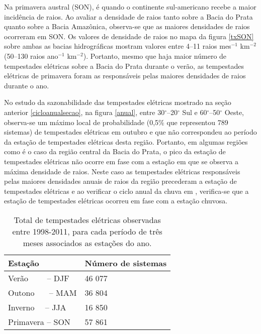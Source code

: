 Na primavera austral (SON), é quando o continente sul-americano recebe a maior incidência de raios. Ao avaliar a densidade de raios tanto sobre a Bacia do Prata quanto sobre a Bacia Amazônica, observa-se que as maiores densidades de raios ocorreram em SON. Os valores de densidade de raios no mapa da figura \ref{txSON} sobre ambas as bacias hidrográficas  mostram valores entre 4--11 raios mes$^{-1}$ km$^{-2}$ (50--130 raios ano$^{-1}$ km$^{-2}$). Portanto, mesmo que haja maior número de tempestades elétricas sobre a Bacia do Prata durante o verão, as tempestades elétricas de primavera foram as responsáveis pelas maiores densidades de raios durante o ano.

No estudo da sazonabilidade das tempestades elétricas mostrado na seção anterior \ref{cicloanualsecao}, na figura \ref{anual}, entre 30$^{\circ}$--20$^{\circ}$ Sul e 60$^{\circ}$--50$^{\circ}$ Oeste, observa-se um máximo local de probabilidade (0,5\% que representou 789 sistemas) de tempestades elétricas em outubro e que não correspondeu ao período da estação de tempestades elétricas desta região. Portanto, em algumas regiões como é o caso da região central da Bacia do Prata,  o pico da estação de tempestades elétricas não ocorre em fase com a estação em que se observa a máxima densidade de raios. Neste caso as tempestades elétricas responsáveis pelas maiores densidades anuais de raios da região precederam a estação de tempestades elétricas e  ao verificar o ciclo anual da chuva em , verifica-se que a estação de tempestades elétricas ocorreu em fase com a estação chuvosa.




\begin{table}[!h]
\caption{Total de tempestades elétricas observadas entre 1998-2011, para cada período de três meses associados as estações do ano.}
\label{EstacaoQtd}
\centering
\small
\newcommand{\grayline}{\rowcolor[gray]{.88}}
\renewcommand {\tabularxcolumn }[1]{ >{\arraybackslash }m{#1}}
\begin{tabularx}{\textwidth}{W W} %
\hline  \hline 
Estação & Número de sistemas \\[1.5pt]  
 \hline
\grayline Verão~~~~ -- DJF & 46 077 \\[1.5pt]
Outono~~~ -- MAM & 36 804\\[1.5pt]
\grayline Inverno~~ -- JJA  & 16 850\\[1.5pt] 
Primavera -- SON & 57 861\\[1.5pt]
\hline 
\end{tabularx}
\end{table}

